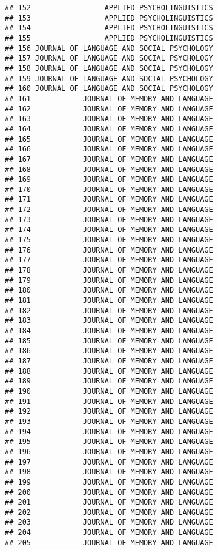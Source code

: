 \documentclass[
  english,
  man]{apa6}
\begin{document}
\begin{verbatim}
## 152                 APPLIED PSYCHOLINGUISTICS
## 153                 APPLIED PSYCHOLINGUISTICS
## 154                 APPLIED PSYCHOLINGUISTICS
## 155                 APPLIED PSYCHOLINGUISTICS
## 156 JOURNAL OF LANGUAGE AND SOCIAL PSYCHOLOGY
## 157 JOURNAL OF LANGUAGE AND SOCIAL PSYCHOLOGY
## 158 JOURNAL OF LANGUAGE AND SOCIAL PSYCHOLOGY
## 159 JOURNAL OF LANGUAGE AND SOCIAL PSYCHOLOGY
## 160 JOURNAL OF LANGUAGE AND SOCIAL PSYCHOLOGY
## 161            JOURNAL OF MEMORY AND LANGUAGE
## 162            JOURNAL OF MEMORY AND LANGUAGE
## 163            JOURNAL OF MEMORY AND LANGUAGE
## 164            JOURNAL OF MEMORY AND LANGUAGE
## 165            JOURNAL OF MEMORY AND LANGUAGE
## 166            JOURNAL OF MEMORY AND LANGUAGE
## 167            JOURNAL OF MEMORY AND LANGUAGE
## 168            JOURNAL OF MEMORY AND LANGUAGE
## 169            JOURNAL OF MEMORY AND LANGUAGE
## 170            JOURNAL OF MEMORY AND LANGUAGE
## 171            JOURNAL OF MEMORY AND LANGUAGE
## 172            JOURNAL OF MEMORY AND LANGUAGE
## 173            JOURNAL OF MEMORY AND LANGUAGE
## 174            JOURNAL OF MEMORY AND LANGUAGE
## 175            JOURNAL OF MEMORY AND LANGUAGE
## 176            JOURNAL OF MEMORY AND LANGUAGE
## 177            JOURNAL OF MEMORY AND LANGUAGE
## 178            JOURNAL OF MEMORY AND LANGUAGE
## 179            JOURNAL OF MEMORY AND LANGUAGE
## 180            JOURNAL OF MEMORY AND LANGUAGE
## 181            JOURNAL OF MEMORY AND LANGUAGE
## 182            JOURNAL OF MEMORY AND LANGUAGE
## 183            JOURNAL OF MEMORY AND LANGUAGE
## 184            JOURNAL OF MEMORY AND LANGUAGE
## 185            JOURNAL OF MEMORY AND LANGUAGE
## 186            JOURNAL OF MEMORY AND LANGUAGE
## 187            JOURNAL OF MEMORY AND LANGUAGE
## 188            JOURNAL OF MEMORY AND LANGUAGE
## 189            JOURNAL OF MEMORY AND LANGUAGE
## 190            JOURNAL OF MEMORY AND LANGUAGE
## 191            JOURNAL OF MEMORY AND LANGUAGE
## 192            JOURNAL OF MEMORY AND LANGUAGE
## 193            JOURNAL OF MEMORY AND LANGUAGE
## 194            JOURNAL OF MEMORY AND LANGUAGE
## 195            JOURNAL OF MEMORY AND LANGUAGE
## 196            JOURNAL OF MEMORY AND LANGUAGE
## 197            JOURNAL OF MEMORY AND LANGUAGE
## 198            JOURNAL OF MEMORY AND LANGUAGE
## 199            JOURNAL OF MEMORY AND LANGUAGE
## 200            JOURNAL OF MEMORY AND LANGUAGE
## 201            JOURNAL OF MEMORY AND LANGUAGE
## 202            JOURNAL OF MEMORY AND LANGUAGE
## 203            JOURNAL OF MEMORY AND LANGUAGE
## 204            JOURNAL OF MEMORY AND LANGUAGE
## 205            JOURNAL OF MEMORY AND LANGUAGE

\end{verbatim}
\end{document}
